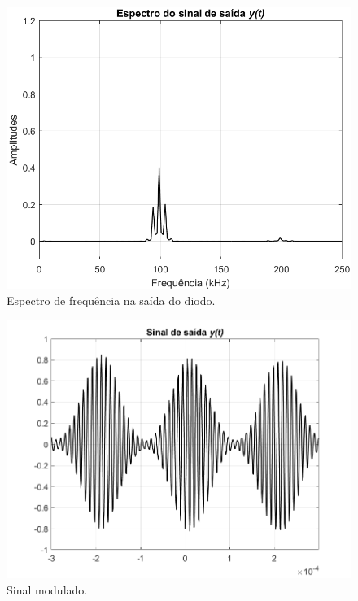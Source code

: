 \documentclass[a4paper,12pt,oneside,openany,table,xcdraw]{article}
\begin{document}
\vspace{0.3cm}
\begin{figure}[H]
\centering
\includegraphics[width=\textwidth]{ex1_espectro_saida}
\caption{Espectro de frequência na saída do diodo.}
\label{1:fft:saida}
\end{figure}

\vspace{0.3cm}
\begin{figure}[H]
\centering
\includegraphics[width=\textwidth]{ex1_yt}
\caption{Sinal modulado.}
\label{1:fft:saida}
\end{figure}


\newpage
\end{document}
